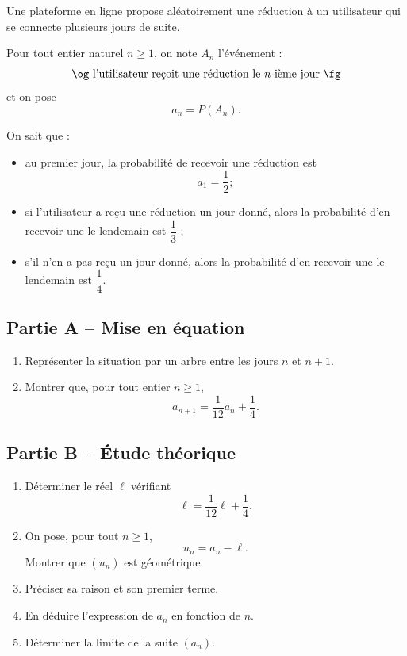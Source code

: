 \documentclass[11pt,a4paper]{article}
\begin{document}
Une plateforme en ligne propose aléatoirement une réduction à un utilisateur qui se connecte plusieurs jours de suite.

Pour tout entier naturel \(n\ge 1\), on note \(A_n\) l'événement :
\[
\text{\og l'utilisateur reçoit une réduction le \(n\)-ième jour \fg}
\]
et on pose
\[
a_n=P(A_n).
\]

On sait que :
\begin{itemize}
    \item au premier jour, la probabilité de recevoir une réduction est
    \[
    a_1=\frac12;
    \]
    \item si l'utilisateur a reçu une réduction un jour donné, alors la probabilité d'en recevoir une le lendemain est \(\dfrac13\) ;
    \item s'il n'en a pas reçu un jour donné, alors la probabilité d'en recevoir une le lendemain est \(\dfrac14\).
\end{itemize}

\subsection*{Partie A -- Mise en équation}
\begin{enumerate}[label=\textbf{2.\arabic*}, leftmargin=1.6em]
    \item Représenter la situation par un arbre entre les jours \(n\) et \(n+1\).
    \item Montrer que, pour tout entier \(n\ge 1\),
    \[
    a_{n+1}=\frac{1}{12}a_n+\frac14.
    \]
\end{enumerate}

\subsection*{Partie B -- Étude théorique}
\begin{enumerate}[label=\textbf{2.\arabic*}, resume, leftmargin=1.6em]
    \item Déterminer le réel \(\ell\) vérifiant
    \[
    \ell=\frac{1}{12}\ell+\frac14.
    \]
    \item On pose, pour tout \(n\ge 1\),
    \[
    u_n=a_n-\ell.
    \]
    Montrer que \((u_n)\) est géométrique.
    \item Préciser sa raison et son premier terme.
    \item En déduire l'expression de \(a_n\) en fonction de \(n\).
    \item Déterminer la limite de la suite \((a_n)\).
\end{enumerate}
\end{document}
